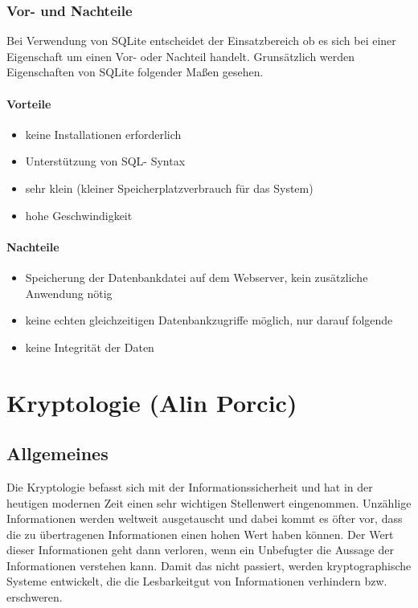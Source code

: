 \documentclass[12pt,a4paper]{report}
\begin{document}
\begin{onehalfspace}
\subsection{Vor- und Nachteile}
Bei Verwendung von SQLite entscheidet der Einsatzbereich ob es sich bei einer Eigenschaft um einen Vor- oder Nachteil handelt. Grunsätzlich werden Eigenschaften von SQLite folgender Maßen gesehen.
\subsubsection{Vorteile}
\begin{itemize}
\item keine Installationen erforderlich
\item Unterstützung von SQL- Syntax
\item sehr klein (kleiner Speicherplatzverbrauch für das System)
\item hohe Geschwindigkeit
\end{itemize}
\subsubsection{Nachteile}
\begin{itemize}
\item Speicherung der Datenbankdatei auf dem Webserver, kein zusätzliche Anwendung nötig
\item keine echten gleichzeitigen Datenbankzugriffe möglich, nur darauf folgende
\item keine Integrität der Daten
\end{itemize}

\chapter{Kryptologie (Alin Porcic)}\label{chap:krypto}
\section{Allgemeines}

Die Kryptologie befasst sich mit der Informationssicherheit und hat in der heutigen modernen Zeit einen sehr wichtigen Stellenwert eingenommen. Unzählige Informationen werden weltweit ausgetauscht und dabei kommt es öfter vor, dass die zu übertragenen Informationen einen hohen Wert haben können. Der Wert dieser Informationen geht dann verloren, wenn ein Unbefugter die Aussage der Informationen verstehen kann. Damit das nicht passiert, werden kryptographische Systeme entwickelt, die die Lesbarkeitgut von Informationen verhindern bzw. erschweren.\\


\end{onehalfspace}
\end{document}
